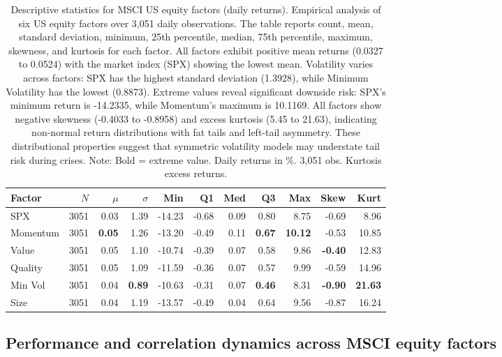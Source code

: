 \documentclass{article}
\begin{document}
\begin{table}[htbp]
\centering
\caption{\small Descriptive statistics for MSCI US equity factors (daily returns). Empirical analysis of six US equity factors over 3,051 daily observations. The table reports count, mean, standard deviation, minimum, 25th percentile, median, 75th percentile, maximum, skewness, and kurtosis for each factor. All factors exhibit positive mean returns (0.0327 to 0.0524) with the market index (SPX) showing the lowest mean. Volatility varies across factors: SPX has the highest standard deviation (1.3928), while Minimum Volatility has the lowest (0.8873). Extreme values reveal significant downside risk: SPX's minimum return is -14.2335, while Momentum's maximum is 10.1169. All factors show negative skewness (-0.4033 to -0.8958) and excess kurtosis (5.45 to 21.63), indicating non-normal return distributions with fat tails and left-tail asymmetry. These distributional properties suggest that symmetric volatility models may understate tail risk during crises. Note: Bold = extreme value. Daily returns in \%. 3,051 obs. Kurtosis excess returns.}
\label{tab:factor_stats}
\footnotesize
\begin{tabular}{lrrrrrrrrrr}
\toprule
Factor   & $N$ & $\mu$ & $\sigma$ & Min & Q1 & Med & Q3 & Max & Skew & Kurt \\
\midrule
SPX      & 3051 & 0.03 & 1.39 & -14.23 & -0.68 & 0.09 & 0.80 & 8.75 & -0.69 & 8.96 \\
Momentum & 3051 & \textbf{0.05} & 1.26 & -13.20 & -0.49 & 0.11 & \textbf{0.67} & \textbf{10.12} & -0.53 & 10.85 \\
Value    & 3051 & 0.05 & 1.10 & -10.74 & -0.39 & 0.07 & 0.58 & 9.86 & \textbf{-0.40} & 12.83 \\
Quality  & 3051 & 0.05 & 1.09 & -11.59 & -0.36 & 0.07 & 0.57 & 9.99 & -0.59 & 14.96 \\
Min Vol  & 3051 & 0.04 & \textbf{0.89} & -10.63 & -0.31 & 0.07 & \textbf{0.46} & 8.31 & \textbf{-0.90} & \textbf{21.63} \\
Size     & 3051 & 0.04 & 1.19 & -13.57 & -0.49 & 0.04 & 0.64 & 9.56 & -0.87 & 16.24 \\
\bottomrule
\end{tabular}
\end{table}

\subsection{Performance and correlation dynamics across MSCI equity factors}
\end{document}
